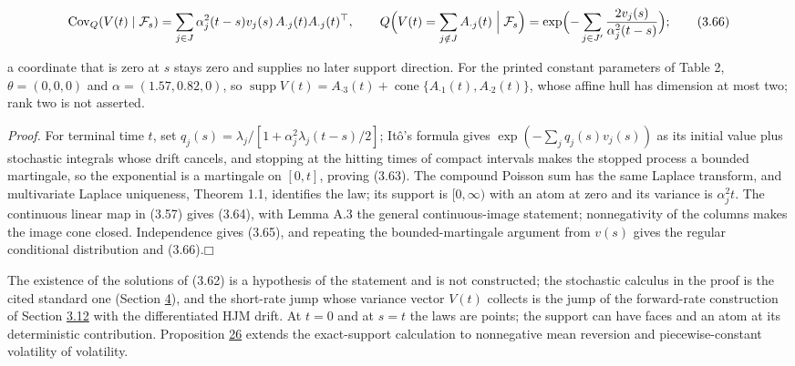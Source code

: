 \documentclass[11pt]{article}
\providecommand{\square}{\mdlgwhtsquare}
\begin{document}
\begin{equation*}
\operatorname{Cov}_Q(V(t) \mid \mathcal F_s) = \sum_{j \in J} \alpha_j^2 (t - s) v_j(s)\, A_{\cdot j}(t) A_{\cdot j}(t)^\top, \qquad Q\Bigl( V(t) = \sum_{j \notin J} A_{\cdot j}(t) \Bigm| \mathcal F_s \Bigr) = \exp\Bigl( -\sum_{j \in J'} \frac{2 v_j(s)}{\alpha_j^2 (t - s)} \Bigr); \tag{3.66}\label{eq:3.66}
\end{equation*}

a coordinate that is zero at \(s\) stays zero and supplies no later support direction. For the printed constant parameters of \cite{brace2024sofr} Table 2, \(\theta = (0, 0, 0)\) and \(\alpha = (1.57, 0.82, 0)\), so \(\operatorname{supp} V(t) = A_{\cdot 3}(t) + \operatorname{cone}\{A_{\cdot 1}(t), A_{\cdot 2}(t)\}\), whose affine hull has dimension at most two; rank two is not asserted.

\emph{Proof.} For terminal time \(t\), set \(q_j(s) = \lambda_j / [1 + \alpha_j^2 \lambda_j (t - s) / 2]\); Itô's formula gives \(\exp(-\sum_j q_j(s) v_j(s))\) as its initial value plus stochastic integrals whose drift cancels, and stopping at the hitting times of compact intervals makes the stopped process a bounded martingale, so the exponential is a martingale on \([0, t]\), proving (3.63). The compound Poisson sum has the same Laplace transform, and multivariate Laplace uniqueness, \cite{li2019continuous} Theorem 1.1, identifies the law; its support is \([0, \infty)\) with an atom at zero and its variance is \(\alpha_j^2 t\). The continuous linear map in (3.57) gives (3.64), with \cite{fontana2025extended} Lemma A.3 the general continuous-image statement; nonnegativity of the columns makes the image cone closed. Independence gives (3.65), and repeating the bounded-martingale argument from \(v(s)\) gives the regular conditional distribution and (3.66).\hfill$\square$

The existence of the solutions of (3.62) is a hypothesis of the statement and is not constructed; the stochastic calculus in the proof is the cited standard one (Section \hyperref[sec:4]{4}), and the short-rate jump whose variance vector \(V(t)\) collects is the jump of the forward-rate construction of Section \hyperref[sec:3.12]{3.12} with the differentiated HJM drift. At \(t = 0\) and at \(s = t\) the laws are points; the support can have faces and an atom at its deterministic contribution. Proposition \hyperref[res:Proposition-26]{26} extends the exact-support calculation to nonnegative mean reversion and piecewise-constant volatility of volatility.
\end{document}
